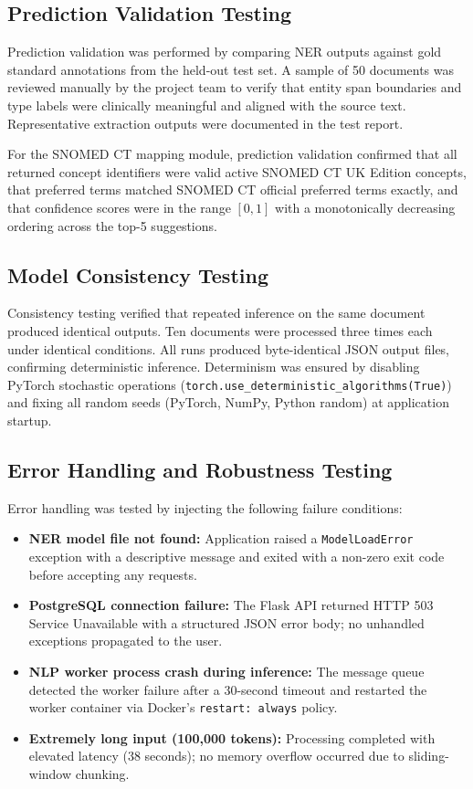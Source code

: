 \subsection{Prediction Validation Testing}
Prediction validation was performed by comparing NER outputs against gold standard annotations from the held-out test set. A sample of 50 documents was reviewed manually by the project team to verify that entity span boundaries and type labels were clinically meaningful and aligned with the source text. Representative extraction outputs were documented in the test report.

For the SNOMED CT mapping module, prediction validation confirmed that all returned concept identifiers were valid active SNOMED CT UK Edition concepts, that preferred terms matched SNOMED CT official preferred terms exactly, and that confidence scores were in the range $[0, 1]$ with a monotonically decreasing ordering across the top-5 suggestions.

\subsection{Model Consistency Testing}
Consistency testing verified that repeated inference on the same document produced identical outputs. Ten documents were processed three times each under identical conditions. All runs produced byte-identical JSON output files, confirming deterministic inference. Determinism was ensured by disabling PyTorch stochastic operations (\texttt{torch.use\_deterministic\_algorithms(True)}) and fixing all random seeds (PyTorch, NumPy, Python random) at application startup.

\subsection{Error Handling and Robustness Testing}
Error handling was tested by injecting the following failure conditions:
\begin{itemize}
    \item \textbf{NER model file not found:} Application raised a \texttt{ModelLoadError} exception with a descriptive message and exited with a non-zero exit code before accepting any requests.
    \item \textbf{PostgreSQL connection failure:} The Flask API returned HTTP 503 Service Unavailable with a structured JSON error body; no unhandled exceptions propagated to the user.
    \item \textbf{NLP worker process crash during inference:} The message queue detected the worker failure after a 30-second timeout and restarted the worker container via Docker's \texttt{restart: always} policy.
    \item \textbf{Extremely long input (100,000 tokens):} Processing completed with elevated latency (38 seconds); no memory overflow occurred due to sliding-window chunking.
\end{itemize}

